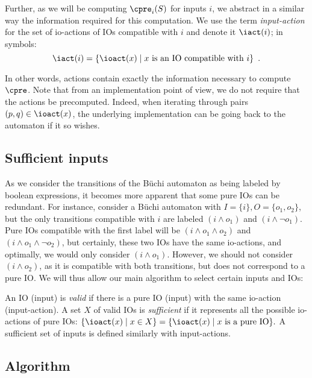 \documentclass[runningheads,a4paper,draft]{llncs}
\begin{document}
Further, as we will be computing \(\cpre_i(S)\) for inputs \(i\), we abstract in a
similar way the information required for this computation.  We use the term
\emph{input-action} for the set of io-actions of IOs compatible with \(i\) and denote
it \(\iact(i)\); in symbols:
\[\iact(i) = \{\ioact(x) \mid x \text{ is an IO compatible with } i\}\enspace.\]

In other words, actions contain exactly the information necessary to compute
\(\cpre\).  Note that from an implementation point of view, we do not require that
the actions be precomputed.  Indeed, when iterating through pairs
\((p, q) \in \ioact(x)\), the underlying implementation can be going back to the
automaton if it so wishes.

\subsection{Sufficient inputs}\label{sec:sufficient}

As we consider the transitions of the Büchi automaton as being labeled by
boolean expressions, it becomes more apparent that some pure IOs can be
redundant.  For instance, consider a Büchi automaton with
\(I = \{i\}, O = \{o_1, o_2\}\), but the only transitions compatible with \(i\) are
labeled \((i \land o_1)\) and \((i \land \neg o_1)\).  Pure IOs compatible with the first
label will be \((i \land o_1 \land o_2)\) and \((i \land o_1 \land \neg o_2)\), but
certainly, these two IOs have the same io-actions, and optimally, we would only
consider \((i \land o_1)\).  However, we should not consider \((i \land o_2)\), as it is
compatible with both transitions, but does not correspond to a pure IO.  We will
thus allow our main algorithm to select certain inputs and IOs:
\begin{definition}
  An IO (\resp input) is \emph{valid} if there is a pure IO (\resp input) with
  the same io-action (\resp input-action).  A set \(X\) of valid IOs is
  \emph{sufficient} if it represents all the possible io-actions of pure IOs:
  \(\{\ioact(x) \mid x \in X\} = \{\ioact(x) \mid x \text{ is a pure IO}\}.\)
  A sufficient set of inputs is defined similarly with input-actions.
\end{definition}

\subsection{Algorithm}\label{sec:algo}
\end{document}

